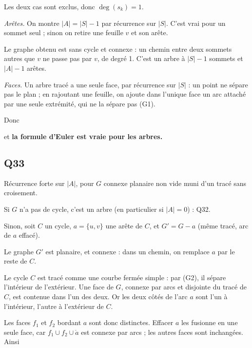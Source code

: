\documentclass[11pt,a4paper]{article}
\newcommand{\equationajustee}[1]{%
  \sbox{\boiteequation}{$\displaystyle #1$}%
  \ifdim\wd\boiteequation>\linewidth
    \[\resizebox{\linewidth}{!}{\usebox{\boiteequation}}\]%
  \else
    \[#1\]%
  \fi}
\begin{document}
Les deux cas sont exclus, donc \(\deg(s_k) = 1\).

\emph{Arêtes.} On montre \(|A| = |S| - 1\) par récurrence sur \(|S|\). C'est vrai pour un sommet seul ; sinon on retire une feuille \(v\) et son arête.

Le graphe obtenu est sans cycle et connexe : un chemin entre deux sommets autres que \(v\) ne passe pas par \(v\), de degré 1. C'est un arbre à \(|S| - 1\) sommets et \(|A| - 1\) arêtes.

\emph{Faces.} Un arbre tracé a une seule face, par récurrence sur \(|S|\) : un point ne sépare pas le plan ; en rajoutant une feuille, on ajoute dans l'unique face un arc attaché par une seule extrémité, qui ne la sépare pas (G1).

Donc

\equationajustee{\begin{aligned}
|S| - |A| + |F| &= |S| - (|S| - 1) + 1 \\
&= 2,
\end{aligned}}

et \textbf{la formule d'Euler est vraie pour les arbres.}

\hypertarget{q33}{%
\subsection{Q33}\label{q33}}

Récurrence forte sur \(|A|\), pour \(G\) connexe planaire non vide muni d'un tracé sans croisement.

Si \(G\) n'a pas de cycle, c'est un arbre (en particulier si \(|A| = 0\)) : Q32.

Sinon, soit \(C\) un cycle, \(a = \{u, v\}\) une arête de \(C\), et \(G' = G - a\) (même tracé, arc de \(a\) effacé).

Le graphe \(G'\) est planaire, et connexe : dans un chemin, on remplace \(a\) par le reste de \(C\).

Le cycle \(C\) est tracé comme une courbe fermée simple : par (G2), il sépare l'intérieur de l'extérieur. Une face de \(G\), connexe par arcs et disjointe du tracé de \(C\), est contenue dans l'un des deux. Or les deux côtés de l'arc \(a\) sont l'un à l'intérieur, l'autre à l'extérieur de \(C\).

Les faces \(f_1\) et \(f_2\) bordant \(a\) sont donc distinctes. Effacer \(a\) les fusionne en une seule face, car \(f_1 \cup f_2 \cup \mathring a\) est connexe par arcs ; les autres faces sont inchangées. Ainsi

\equationajustee{\begin{aligned}
|S'| &= |S| \\
|A'| &= |A| - 1 \\
|F'| &= |F| - 1
\end{aligned}}
\end{document}
